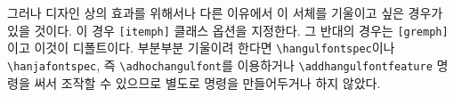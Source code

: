\documentclass[
	12pt,
	a4paper,
	kosection,
	footnote,
	nobookmarks,
	microtype,
	figtabcapt,
]{oblivoir}
\def\cs#1{\texttt{\textbackslash #1}}
\def\oblivoirdblquote#1{``#1''}
\newcommand\xobclass{x\-ob\-liv\-oir\oblivoirallowbreak}
\newcommand\obclass{ob\-liv\-oir\oblivoirallowbreak}
\def\xetexko{\XeTeX-\ko}
\begin{document}
그러나 디자인 상의 효과를 위해서나 다른 이유에서 
이 서체를 기울이고 싶은 경우가 있을 것이다.
이 경우 \texttt{[itemph]} 클래스 옵션을 지정한다.
그 반대의 경우는 \texttt{[gremph]}이고 이것이 디폴트이다. 부분부분 기울이려 한다면 \cs{hangulfontspec}이나
\cs{hanjafontspec}, 즉 \cs{adhochangulfont}를 이용하거나 \cs{addhangulfontfeature} 명령을 써서 조작할 수 있으므로 별도로 명령을 만들어두거나 하지 않았다.

%
%




\end{document}
